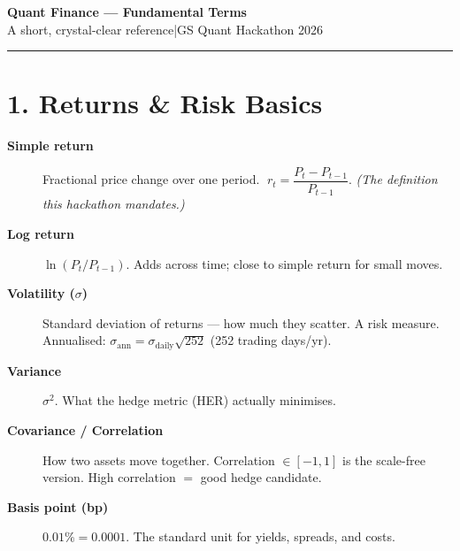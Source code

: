 \documentclass[10pt]{article}
\newcommand{\term}[1]{\textcolor{term}{\textbf{#1}}}
\begin{document}
\begin{center}
{\LARGE\bfseries\color{gsblue} Quant Finance — Fundamental Terms}\\[2pt]
{\small A short, crystal-clear reference\quad|\quad GS Quant Hackathon 2026}
\end{center}
\vspace{2pt}\hrule\vspace{6pt}

\section{1. Returns \& Risk Basics}
\begin{description}
\item[\term{Simple return}] Fractional price change over one period.
$\;r_t = \dfrac{P_t - P_{t-1}}{P_{t-1}}$. \emph{(The definition this hackathon mandates.)}
\item[\term{Log return}] $\ln(P_t/P_{t-1})$. Adds across time; close to simple return for small moves.
\item[\term{Volatility ($\sigma$)}] Standard deviation of returns — how much they scatter. A risk measure.
Annualised: $\sigma_{\text{ann}} = \sigma_{\text{daily}}\sqrt{252}$ (252 trading days/yr).
\item[\term{Variance}] $\sigma^2$. What the hedge metric (HER) actually minimises.
\item[\term{Covariance / Correlation}] How two assets move together. Correlation $\in[-1,1]$ is the
scale-free version. High correlation $=$ good hedge candidate.
\item[\term{Basis point (bp)}] $0.01\% = 0.0001$. The standard unit for yields, spreads, and costs.
\end{description}

\end{document}
